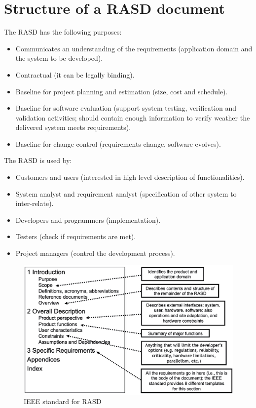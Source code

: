 \documentclass[12pt, a4paper]{report}
\begin{document}
    \section{Structure of a RASD document}
        The RASD has the following purposes: 
        \begin{itemize}
            \item Communicates an understanding of the requirements (application domain and the system to be developed).
            \item Contractual (it can be legally binding).
            \item Baseline for project planning and estimation (size, cost and schedule).
            \item Baseline for software evaluation (support system testing, verification and validation activities; should contain enough information to verify weather the delivered system meets requirements).
            \item Baseline for change control (requirements change, software evolves).
        \end{itemize}
        The RASD is used by:
        \begin{itemize}
            \item Customers and users (interested in high level description of functionalities).
            \item System analyst and requirement analyst (specification of other system to inter-relate).
            \item Developers and programmers (implementation).
            \item Testers (check if requirements are met).
            \item Project managers (control the development process).
        \end{itemize}
        \begin{figure}[H]
            \centering
            \includegraphics[width=1\linewidth]{images/RASD.png}
            \caption{IEEE standard for RASD}
        \end{figure}
         
\end{document}
